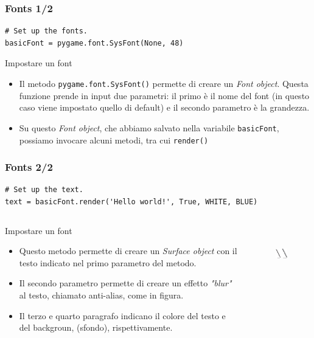\documentclass{beamer}
\begin{document}
\begin{frame}[fragile]
\frametitle{Fonts 1/2}
\begin{lstlisting}
# Set up the fonts.
basicFont = pygame.font.SysFont(None, 48)
\end{lstlisting}
\begin{block}{Impostare un font}
	\begin{itemize}
		\item Il metodo \texttt{pygame.font.SysFont()} permette di creare un \textit{Font object}. Questa funzione prende in input due parametri: il primo è il nome del font (in questo caso viene impostato quello di default) e il secondo parametro è la grandezza.
		\item Su questo \textit{Font object}, che abbiamo salvato nella variabile \texttt{basicFont}, possiamo invocare alcuni metodi, tra cui \texttt{render()}
	\end{itemize}
\end{block}
\end{frame}

\begin{frame}[fragile]
\frametitle{Fonts 2/2}
\begin{lstlisting}
# Set up the text.
text = basicFont.render('Hello world!', True, WHITE, BLUE)
\end{lstlisting}

\begin{columns}
	\begin{column}[T]{0.7\textwidth}
		\begin{block}{Impostare un font}
			\begin{itemize}
				\item Questo metodo permette di creare un \textit{Surface object} con il testo indicato nel primo parametro del metodo.
				\item Il secondo parametro permette di creare un effetto \textit{"blur"} al testo, chiamato anti-alias, come in figura.
				\item Il terzo e quarto paragrafo indicano il colore del testo e del backgroun, (sfondo), rispettivamente.
			\end{itemize}
		\end{block}
	\end{column}
	\begin{column}[T]{0.3\textwidth}
		\begin{figure}[t]
			\includegraphics[height=2.5cm, width=2.5cm]{images/anti-aliased.png}
		\end{figure}
	\end{column}
\end{columns}

\end{frame}
\end{document}
